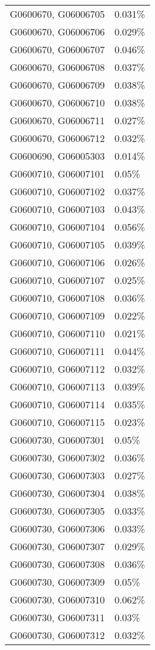 \begin{longtable}[]{@{}ll@{}}
G0600670, G06006705 & 0.031\% \\
G0600670, G06006706 & 0.029\% \\
G0600670, G06006707 & 0.046\% \\
G0600670, G06006708 & 0.037\% \\
G0600670, G06006709 & 0.038\% \\
G0600670, G06006710 & 0.038\% \\
G0600670, G06006711 & 0.027\% \\
G0600670, G06006712 & 0.032\% \\
G0600690, G06005303 & 0.014\% \\
G0600710, G06007101 & 0.05\% \\
G0600710, G06007102 & 0.037\% \\
G0600710, G06007103 & 0.043\% \\
G0600710, G06007104 & 0.056\% \\
G0600710, G06007105 & 0.039\% \\
G0600710, G06007106 & 0.026\% \\
G0600710, G06007107 & 0.025\% \\
G0600710, G06007108 & 0.036\% \\
G0600710, G06007109 & 0.022\% \\
G0600710, G06007110 & 0.021\% \\
G0600710, G06007111 & 0.044\% \\
G0600710, G06007112 & 0.032\% \\
G0600710, G06007113 & 0.039\% \\
G0600710, G06007114 & 0.035\% \\
G0600710, G06007115 & 0.023\% \\
G0600730, G06007301 & 0.05\% \\
G0600730, G06007302 & 0.036\% \\
G0600730, G06007303 & 0.027\% \\
G0600730, G06007304 & 0.038\% \\
G0600730, G06007305 & 0.033\% \\
G0600730, G06007306 & 0.033\% \\
G0600730, G06007307 & 0.029\% \\
G0600730, G06007308 & 0.036\% \\
G0600730, G06007309 & 0.05\% \\
G0600730, G06007310 & 0.062\% \\
G0600730, G06007311 & 0.03\% \\
G0600730, G06007312 & 0.032\% \\

\end{longtable}
